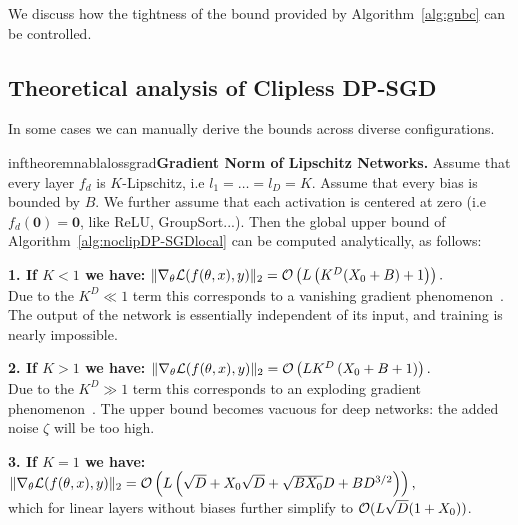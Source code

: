  We discuss how the tightness of the bound provided by Algorithm~\ref{alg:gnbc} can be controlled.  

\subsection{Theoretical analysis of Clipless DP-SGD}
\label{sec:gnp}
    In some cases we can manually derive the bounds across diverse configurations.%
    \begin{restatable}{inftheorem}{nablalossgrad}{\normalfont\textbf{Gradient Norm of Lipschitz Networks.}}\label{infthm:nablalossgrad}
        Assume that every layer $f_d$ is $K$-Lipschitz, i.e $l_1=\dots=l_D=K$. Assume that every bias is bounded by $B$. We further assume that each activation is centered at zero (i.e $f_d(\bm 0)=\bm 0$, like ReLU, GroupSort...).%
         Then the global upper bound of Algorithm~\ref{alg:noclipDP-SGDlocal} can be computed analytically, as follows:
        
        \textbf{1. If $K<1$ we have:}
        $
        \|\nabla_{\theta}\mathcal{L}(f(\theta,x),y)\|_2=\mathcal{O}\left(L\left(K^D(X_0+B)+1\right)\right).
        $\\
        Due to the $K^D\ll 1$ term this corresponds to a vanishing gradient phenomenon~\citep{pascanu2013difficulty}. The output of the network is essentially independent of its input, and training is nearly impossible. 
    
        \textbf{2. If $K>1$ we have:}
        $
            \|\nabla_{\theta}\mathcal{L}(f(\theta,x),y)\|_2=\mathcal{O}\left(LK^D \left(X_0+B+1\right)\right).
        $\\
        Due to the $K^{D}\gg 1$ term this corresponds to an exploding gradient phenomenon~\citep{bengio1994learning}. The upper bound becomes vacuous for deep networks: the added noise $\zeta$ will be too high.  
    
        \textbf{3. If $K=1$ we have:}
        $
            \|\nabla_{\theta}\mathcal{L}(f(\theta,x),y)\|_2=\mathcal{O}\left(L\left(\sqrt{D}+X_0\sqrt{D}+\sqrt{BX_0}D+BD^{3/2}\right)\right),
        $\\
        which for linear layers without biases further simplify to $\mathcal{O}(L\sqrt{D}(1+X_0))$.  
    \end{restatable}
